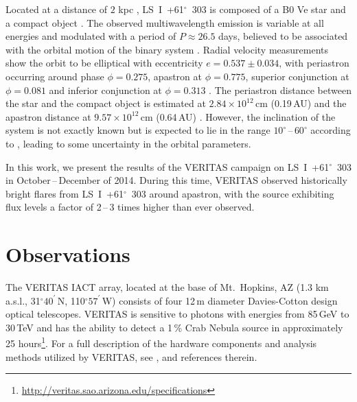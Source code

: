 \documentclass[preprint2]{aastex}
\newcommand{\tapp}{\raisebox{0.5ex}{\texttildelow}}
\newcommand{\lsi}{LS~I~+61$^{\circ}$~303}
\newcommand{\gev}{\,GeV}
\newcommand{\tev}{\,TeV}
\begin{document}
Located at a distance of \tapp{}$2$ kpc \citep{1991AJ....101.2126F}, \lsi{} is composed of a B0 Ve star and a compact object \citep{HandC1981, Casares2005}. The observed multiwavelength emission is variable at all energies and modulated with a period of $P \approx 26.5$ days, believed to be associated with the orbital motion of the binary system \citep{Albert2006, Esposito2007, VERITASLSIDetection, Abdo2009, LiXray, 2015A&A...575L...9M}. Radial velocity measurements show the orbit to be elliptical with eccentricity $e = 0.537\pm0.034$, with periastron occurring around phase $\phi=0.275$, apastron at $\phi=0.775$, superior conjunction at $\phi=0.081$ and inferior conjunction at $\phi=0.313$ \citep{Aragona2009}. The periastron distance between the star and the compact object is estimated at $2.84 \times 10^{12}$\,cm (0.19\,AU) and the apastron distance at $9.57 \times 10^{12}$\,cm (0.64\,AU) \citep{2013A&ARv..21...64D}. However, the inclination of the system is not exactly known but is expected to lie in the range $10^\circ$\,--\,$60^\circ$ according to \citet{Casares2005}, leading to some uncertainty in the orbital parameters.


In this work, we present the results of the VERITAS campaign on \lsi{} in October\,--\,December of 2014. During this time, VERITAS observed historically bright flares from \lsi{} around apastron, with the source exhibiting flux levels a factor of 2\,--\,3 times higher than ever observed.

\section{Observations}
The VERITAS IACT array, located at the base of Mt.\ Hopkins, AZ (1.3 km a.s.l., 31$^{\circ}40^\prime$\,N, 110$^{\circ}57^\prime$\,W) consists of four 12\,m diameter Davies-Cotton design optical telescopes. VERITAS is sensitive to photons with energies from 85\gev{} to 30\tev{} and has the ability to detect a 1\,\% Crab Nebula source in approximately 25 hours\footnote{\url{http://veritas.sao.arizona.edu/specifications}}. For a full description of the hardware components and analysis methods utilized by VERITAS, see \citet{VERITAS, KiedaVTSUpgrade, VERITASLSIDetection}, and references therein.
\end{document}
